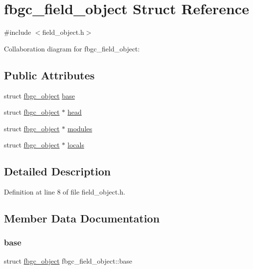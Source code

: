 \hypertarget{structfbgc__field__object}{}\section{fbgc\+\_\+field\+\_\+object Struct Reference}
\label{structfbgc__field__object}


{\ttfamily \#include $<$field\+\_\+object.\+h$>$}



Collaboration diagram for fbgc\+\_\+field\+\_\+object\+:
\subsection*{Public Attributes}
\begin{DoxyCompactItemize}
\item 
struct \hyperlink{structfbgc__object}{fbgc\+\_\+object} \hyperlink{structfbgc__field__object_aa0fca8328653a3e338bdc29fd0258c55}{base}
\item 
struct \hyperlink{structfbgc__object}{fbgc\+\_\+object} $\ast$ \hyperlink{structfbgc__field__object_a5661b6bc4d219b6358bb69e67ca9737d}{head}
\item 
struct \hyperlink{structfbgc__object}{fbgc\+\_\+object} $\ast$ \hyperlink{structfbgc__field__object_a398da35ea508623d00bb92bf2aee7eef}{modules}
\item 
struct \hyperlink{structfbgc__object}{fbgc\+\_\+object} $\ast$ \hyperlink{structfbgc__field__object_aab85ff02efee9aadc0e3370aa49234d5}{locals}
\end{DoxyCompactItemize}


\subsection{Detailed Description}


Definition at line 8 of file field\+\_\+object.\+h.



\subsection{Member Data Documentation}
\mbox{\label{structfbgc__field__object_aa0fca8328653a3e338bdc29fd0258c55}} 
\subsubsection{\texorpdfstring{base}{base}}
{\footnotesize\ttfamily struct \hyperlink{structfbgc__object}{fbgc\+\_\+object} fbgc\+\_\+field\+\_\+object\+::base}



